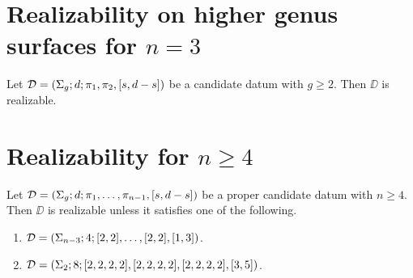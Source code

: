 \section{Realizability on higher genus surfaces for $n=3$}

\begin{theorem}\label{short-partition:th:realizability-on-higher-genus-n-3}
Let $\mathcal{D}=(\Sigma_{g};d;\pi_1,\pi_2,[s,d-s])$ be a candidate datum with $g\ge 2$. Then $\DD$ is realizable.
\end{theorem}

\section{Realizability for $n\ge 4$}

\begin{theorem}
Let $\mathcal{D}=(\Sigma_{g};d;\pi_1,\ldots,\pi_{n-1},[s,d-s])$ be a proper candidate datum with $n\ge 4$. Then $\DD$ is realizable unless it satisfies one of the following.
\begin{enumerate}[(1)]
\item $\mathcal{D}=(\Sigma_{n-3};4;[2,2],\ldots,[2,2],[1,3])$.
\item $\mathcal{D}=(\Sigma_{2};8;[2,2,2,2],[2,2,2,2],[2,2,2,2],[3,5])$.
\end{enumerate}
\end{theorem}
